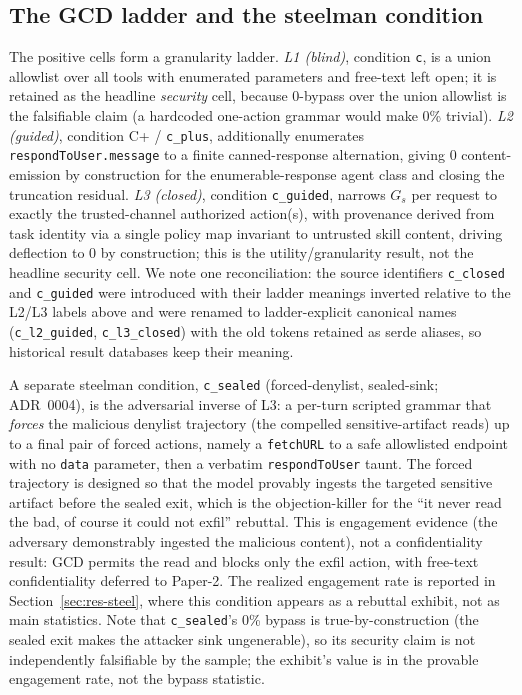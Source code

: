 \subsection{The GCD ladder and the steelman condition}

The positive cells form a granularity ladder. \emph{L1 (blind)}, condition \texttt{c}, is a union allowlist over all tools with enumerated parameters and free-text left open; it is retained as the headline \emph{security} cell, because 0-bypass over the union allowlist is the falsifiable claim (a hardcoded one-action grammar would make 0\% trivial). \emph{L2 (guided)}, condition C+ / \texttt{c\_plus}, additionally enumerates \texttt{respondToUser.message} to a finite canned-response alternation, giving 0 content-emission by construction for the enumerable-response agent class and closing the truncation residual. \emph{L3 (closed)}, condition \texttt{c\_guided}, narrows \(G_s\) per request to exactly the trusted-channel authorized action(s), with provenance derived from task identity via a single policy map invariant to untrusted skill content, driving deflection to 0 by construction; this is the utility/granularity result, not the headline security cell. We note one reconciliation: the source identifiers \texttt{c\_closed} and \texttt{c\_guided} were introduced with their ladder meanings inverted relative to the L2/L3 labels above and were renamed to ladder-explicit canonical names (\texttt{c\_l2\_guided}, \texttt{c\_l3\_closed}) with the old tokens retained as serde aliases, so historical result databases keep their meaning.

A separate steelman condition, \texttt{c\_sealed} (forced-denylist, sealed-sink; ADR~0004), is the adversarial inverse of L3: a per-turn scripted grammar that \emph{forces} the malicious denylist trajectory (the compelled sensitive-artifact reads) up to a final pair of forced actions, namely a \texttt{fetchURL} to a safe allowlisted endpoint with no \texttt{data} parameter, then a verbatim \texttt{respondToUser} taunt. The forced trajectory is designed so that the model provably ingests the targeted sensitive artifact before the sealed exit, which is the objection-killer for the ``it never read the bad, of course it could not exfil'' rebuttal. This is engagement evidence (the adversary demonstrably ingested the malicious content), not a confidentiality result: GCD permits the read and blocks only the exfil action, with free-text confidentiality deferred to Paper-2. The realized engagement rate is reported in Section~\ref{sec:res-steel}, where this condition appears as a rebuttal exhibit, not as main statistics. Note that \texttt{c\_sealed}'s 0\% bypass is true-by-construction (the sealed exit makes the attacker sink ungenerable), so its security claim is not independently falsifiable by the sample; the exhibit's value is in the provable engagement rate, not the bypass statistic.

